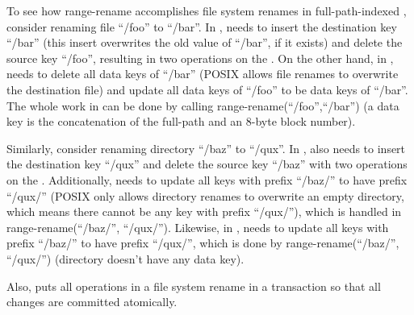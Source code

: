 To see how range-rename accomplishes file system renames in full-path-indexed
\betrfs, consider renaming file ``/foo'' to ``/bar''.
In \mdb, \betrfs needs to insert the destination key ``/bar''
(this insert overwrites the old value of ``/bar'', if it exists)
and delete the source key ``/foo'', resulting in two operations on the \bet.
On the other hand, in \ddb, \betrfs needs to delete all data keys of ``/bar''
(POSIX allows file renames to overwrite the destination file) and update all
data keys of ``/foo'' to be data keys of ``/bar''.
The whole work in \ddb can be done by calling range-rename(``/foo'',``/bar'')
(a data key is the concatenation of the full-path and an 8-byte block number).

Similarly, consider renaming directory ``/baz'' to ``/qux''.
In \mdb, \betrfs also needs to insert the destination key ``/qux'' and delete
the source key ``/baz'' with two operations on the \bet.
Additionally, \betrfs needs to update all keys with prefix ``/baz/'' to have
prefix ``/qux/''
(POSIX only allows directory renames to overwrite an empty directory, which
means there cannot be any key with prefix ``/qux/''),
which is handled in range-rename(``/baz/'', ``/qux/'').
Likewise, in \ddb, \betrfs needs to update all keys with prefix ``/baz/''
to have prefix ``/qux/'', which is done by range-rename(``/baz/'', ``/qux/'')
(directory doesn't have any data key).

Also, \betrfs puts all operations in a file system rename in a transaction
so that all changes are committed atomically.

